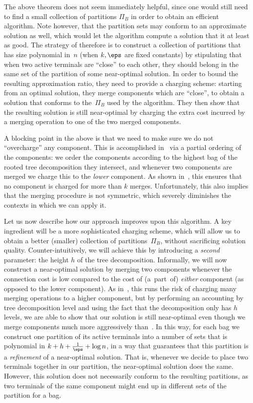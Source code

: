 The above theorem does not seem immediately helpful, since one would still need to
find a small collection of partitions $\Pi_B$ in order to obtain an efficient algorithm. 
Note however, that the partition sets may conform to an approximate solution as well, which
would let the algorithm compute a solution that it at least as good.
The strategy of \cite{bateni2011approximation} therefore is to
construct a collection of partitions that has size polynomial in~$n$ (when $k,\eps$ are
fixed constants) by stipulating that when two active terminals are ``close'' to
each other, they should belong in the same set of the partition of some near-optimal solution. In order to
bound the resulting approximation ratio, they need to provide a
charging scheme: starting from an optimal solution, they merge components which are
``close'', to obtain a solution that conforms to the~$\Pi_B$ used by the algorithm. 
They then show that the resulting solution is still near-optimal by charging the extra
cost incurred by a merging operation to one of the two merged components.

A blocking point in the above is that we need to make sure we do not
``overcharge'' any component. This is accomplished in~\cite{bateni2011approximation}
via a partial ordering of the components: we
order the components according to the highest bag of the rooted tree decomposition they
intersect, and whenever two components are merged we charge this to the
\emph{lower} component. As shown in~\cite{bateni2011approximation},
this ensures that no component is charged for more than
$k$ merges. Unfortunately, this also implies that the merging procedure is not
symmetric, which severely diminishes the contexts in which we can apply it.

Let us now describe how our approach improves upon this algorithm. A key
ingredient  will be a more sophisticated charging scheme, which will allow us
to obtain a better (smaller) collection of partitions~$\Pi_B$, without
sacrificing solution quality.  Counter-intuitively, we will achieve this by
introducing a \emph{second} parameter: the height $h$ of the tree
decomposition.  Informally, we will now construct a near-optimal solution by
merging two components whenever the connection cost is low compared to the cost of
(a~part~of) \emph{either} component (as opposed to the lower component). As 
in~\cite{bateni2011approximation}, this runs the risk of charging many merging
operations to a higher component, but by performing an accounting by tree
decomposition level and using the fact that the decomposition only has $h$
levels, we are able to show that our solution is still near-optimal even though
we merge components much more aggressively than~\cite{bateni2011approximation}.
In this way, for each bag we construct one partition of its active terminals into
a number of sets that is polynomial in $k+h+\frac{1}{\eps}+\log n$, in a way
that guarantees that this partition is a \emph{refinement} of a near-optimal
solution. That is, whenever we decide to place two terminals together in our
partition, the near-optimal solution does the same. However, this solution does
not necessarily conform to the resulting partitions, as two terminals of the same component
might end up in different sets of the partition for a bag.

